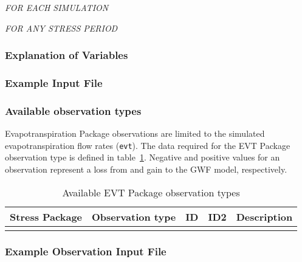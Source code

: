 \noindent \textit{FOR EACH SIMULATION}


\vspace{5mm}
\noindent \textit{FOR ANY STRESS PERIOD}


\vspace{5mm}
\subsubsection{Explanation of Variables}
\begin{description}

\end{description}

\vspace{5mm}
\subsubsection{Example Input File}


\vspace{5mm}
\subsubsection{Available observation types}
Evapotranspiration Package observations are limited to the simulated evapotranspiration flow rates (\texttt{evt}). The data required for the EVT Package observation type is defined in table~\ref{table:gwf-evtobstype}. Negative and positive values for an observation represent a loss from and gain to the GWF model, respectively.

\begin{longtable}{p{2cm} p{2.75cm} p{2cm} p{1.25cm} p{7cm}}
\caption{Available EVT Package observation types} \tabularnewline

\hline
\hline
\textbf{Stress Package} & \textbf{Observation type} & \textbf{ID} & \textbf{ID2} & \textbf{Description} \\
\hline
\endhead

\hline
\endfoot


\label{table:gwf-evtobstype}
\end{longtable}

\vspace{5mm}
\subsubsection{Example Observation Input File}

